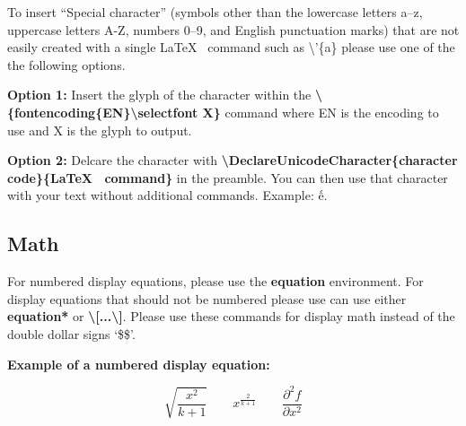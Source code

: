 \documentclass{csmagazine}
\begin{document}
\begin{flushleft}
To insert ``Special character'' (symbols other than the lowercase letters a–z, uppercase letters A-Z, numbers 0–9, and English punctuation marks) that are not easily created with a single \LaTeX~ command such as \textbackslash{}'\{a\} please use one of the the following options.

\textbf{Option 1:} Insert the glyph of the character within the \textbf{\textbackslash{}\{fontencoding\{EN\}\textbackslash{}selectfont X\}} command where EN is the encoding to use and X is the glyph to output.


\textbf{Option 2:} Delcare the character with \textbf{\textbackslash{}DeclareUnicodeCharacter\{character code\}\{\LaTeX~ command\}} in the preamble. You can then use that character with your text without additional commands. Example: ế.




\subsection{Math}

For numbered display equations, please use the \textbf{equation} environment. For display equations that should not be numbered please use can use either \textbf{equation*}  or \textbf{\textbackslash[...\textbackslash]}. Please use these commands for display math instead of the double dollar signs `\$\$'.

\textbf{Example of a numbered display equation:}

\begin{equation}
\sqrt{\frac{x^2}{k+1}}\qquad
x^\frac{2}{k+1}\qquad
\frac{\partial^2f}{\partial x^2}
\end{equation}


\end{flushleft}
\end{document}
